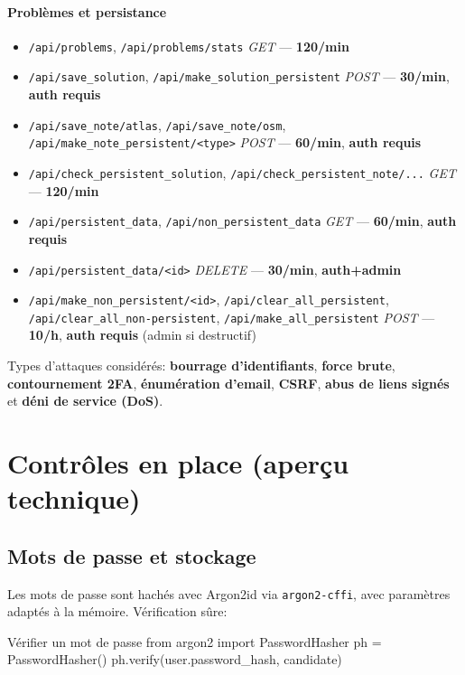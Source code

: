\paragraph{Problèmes et persistance}
\begin{itemize}
  \item \texttt{/api/problems}, \texttt{/api/problems/stats} \textit{GET} — \textbf{120/min}
  \item \texttt{/api/save\_solution}, \texttt{/api/make\_solution\_persistent} \textit{POST} — \textbf{30/min}, \textbf{auth requis}
  \item \texttt{/api/save\_note/atlas}, \texttt{/api/save\_note/osm}, \texttt{/api/make\_note\_persistent/<type>} \textit{POST} — \textbf{60/min}, \textbf{auth requis}
  \item \texttt{/api/check\_persistent\_solution}, \texttt{/api/check\_persistent\_note/...} \textit{GET} — \textbf{120/min}
  \item \texttt{/api/persistent\_data}, \texttt{/api/non\_persistent\_data} \textit{GET} — \textbf{60/min}, \textbf{auth requis}
  \item \texttt{/api/persistent\_data/<id>} \textit{DELETE} — \textbf{30/min}, \textbf{auth+admin}
  \item \texttt{/api/make\_non\_persistent/<id>}, \texttt{/api/clear\_all\_persistent}, \texttt{/api/clear\_all\_non-persistent}, \texttt{/api/make\_all\_persistent} \textit{POST} — \textbf{10/h}, \textbf{auth requis} (admin si destructif)
\end{itemize}

\noindent Types d'attaques considérés: \textbf{bourrage d'identifiants}, \textbf{force brute}, \textbf{contournement 2FA}, \textbf{énumération d'email}, \textbf{CSRF}, \textbf{abus de liens signés} et \textbf{déni de service (DoS)}.

\section{Contrôles en place (aperçu technique)}

\subsection*{Mots de passe et stockage}
\noindent Les mots de passe sont hachés avec Argon2id via \texttt{argon2-cffi}, avec paramètres adaptés à la mémoire. Vérification sûre:
\begin{codebox}[language=Python]{Vérifier un mot de passe}
from argon2 import PasswordHasher
ph = PasswordHasher()
ph.verify(user.password_hash, candidate)
\end{codebox}

